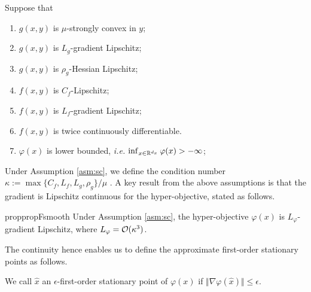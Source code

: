 \documentclass{article}
\begin{document}
\begin{asm} \label{asm:sc}
Suppose that
\begin{enumerate}
    \item $g(x,y)$ is $\mu$-strongly convex in $y$;
     \item $g(x,y)$ is $L_g$-gradient Lipschitz;
    \item $g(x,y)$ is $\rho_g$-Hessian Lipschitz;
     \item $f(x,y)$ is $C_f$-Lipschitz;
    \item $f(x,y)$ is $L_f$-gradient Lipschitz;
    \item  $f(x,y)$ is twice continuously differentiable.
    \item $\varphi(x)$ is lower bounded, \emph{i.e.} $\inf_{x \in {\mathbb{R}}^{d_x}} \varphi(x) > - \infty$;
\end{enumerate}
\end{asm}

Under Assumption \ref{asm:sc}, we define the condition number 
   $\kappa:= \max \{ C_f,L_f,L_g,\rho_g  \} / \mu$ .
A key result from the above assumptions is that the gradient is Lipschitz continuous for the hyper-objective, stated as follows.

\begin{restatable}{prop}{propFsmooth}
    \label{prop:F-smooth}
Under Assumption \ref{asm:sc}, the hyper-objective $\varphi(x)$ is $L_\varphi$-gradient Lipschitz, where $L_\varphi = {\mathcal{O}}(\kappa^3)$.
 \end{restatable}

The continuity hence enables us to define the approximate first-order stationary points as follows.
\begin{dfn} \label{dfn:sta-hyper}
We call $\hat x$ an $\epsilon$-first-order stationary point of $\varphi(x)$ if $ \Vert \nabla \varphi(\hat x) \Vert \le \epsilon$.
\end{dfn}
\end{document}
